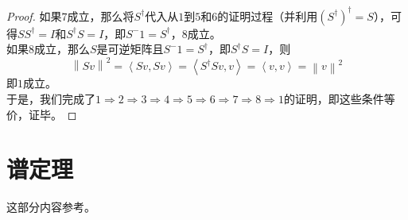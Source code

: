 \documentclass[12pt,a4paper,openany,twoside]{book}
\numberwithin{equation}{section}
\begin{document}
\begin{proof}
          如果$7$成立，那么将$S^\dagger$代入从$1$到$5$和$6$的证明过程（并利用$\left(S^\dagger\right)^\dagger=S$），可得$SS^\dagger=I$和$S^\dagger S=I$，即$S^-1=S^\dagger$，$8$成立。\\
          如果$8$成立，那么$S$是可逆矩阵且$S^-1=S^\dagger$，即$S^\dagger S=I$，则
          \begin{equation}
            \left\|Sv\right\|^2=\left\langle Sv,Sv\right\rangle=\left\langle S^\dagger Sv,v\right\rangle=\left\langle v,v\right\rangle=\left\|v\right\|^2
          \end{equation}
          即$1$成立。\\
          于是，我们完成了$1\Rightarrow2\Rightarrow3\Rightarrow4\Rightarrow5\Rightarrow6\Rightarrow7\Rightarrow8\Rightarrow1$的证明，即这些条件等价，证毕。
        \end{proof}

      \section{谱定理}
        \label{spectral_theorem}
        这部分内容参考\cite{linear_algebra_done_right}。
\end{document}
